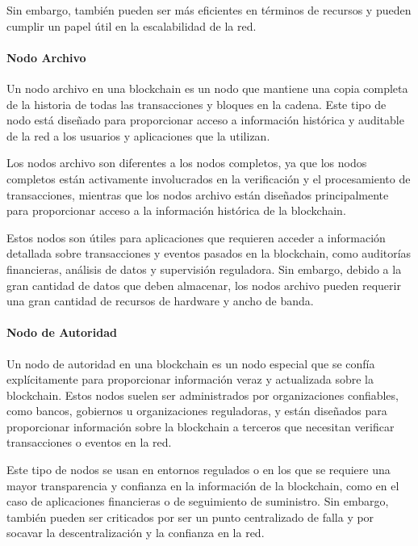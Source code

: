     Sin embargo, también pueden ser más eficientes en términos de recursos y pueden cumplir un papel útil en la escalabilidad de la red.
    
    \paragraph{Nodo Archivo}
    
    Un nodo archivo en una blockchain es un nodo que mantiene una copia completa de la historia de todas las transacciones y bloques en la cadena. Este tipo de nodo está diseñado para proporcionar acceso a información histórica y auditable de la red a los usuarios y aplicaciones que la utilizan.
    
    \bigskip
    
    Los nodos archivo son diferentes a los nodos completos, ya que los nodos completos están activamente involucrados en la verificación y el procesamiento de transacciones, mientras que los nodos archivo están diseñados principalmente para proporcionar acceso a la información histórica de la blockchain.
    
    \bigskip
    
    Estos nodos son útiles para aplicaciones que requieren acceder a información detallada sobre transacciones y eventos pasados en la blockchain, como auditorías financieras, análisis de datos y supervisión reguladora. Sin embargo, debido a la gran cantidad de datos que deben almacenar, los nodos archivo pueden requerir una gran cantidad de recursos de hardware y ancho de banda.
    
    \paragraph{Nodo de Autoridad}
    
    Un nodo de autoridad en una blockchain es un nodo especial que se confía explícitamente para proporcionar información veraz y actualizada sobre la blockchain. Estos nodos suelen ser administrados por organizaciones confiables, como bancos, gobiernos u organizaciones reguladoras, y están diseñados para proporcionar información sobre la blockchain a terceros que necesitan verificar transacciones o eventos en la red.
    
    \bigskip
    
    Este tipo de nodos se usan en entornos regulados o en los que se requiere una mayor transparencia y confianza en la información de la blockchain, como en el caso de aplicaciones financieras o de seguimiento de suministro. Sin embargo, también pueden ser criticados por ser un punto centralizado de falla y por socavar la descentralización y la confianza en la red.

